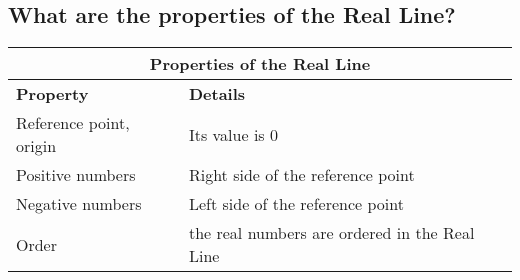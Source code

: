 \subsection{What are the properties of the Real Line?}

\begin{small}
\begin{tabularx}{1\textwidth}{
        p{}
        p{}
    }
    \toprule
    \multicolumn{2}{c}{\textbf{Properties of the Real Line}} \\
    \midrule

    \textbf{Property} & \textbf{Details}\\
    \midrule

    Reference point, origin & Its value is $0$ \\
    \midrule

    Positive numbers & Right side of the reference point \\
    \midrule

    Negative numbers & Left side of the reference point \\
    \midrule

    Order & the real numbers are ordered in the Real Line \\
    \bottomrule

\end{tabularx}
\end{small}

